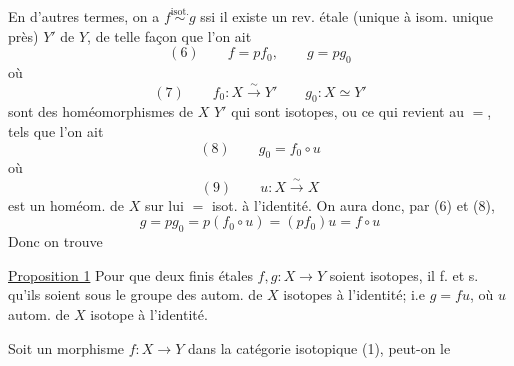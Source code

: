 En d'autres termes, on a $f\overset{\mathrm{isot.}}{\sim}g$ ssi il existe un rev.  étale (unique à isom. unique près) $Y'$ de $Y$, de telle façon que l'on ait
\[
(6)\qquad f=pf_0,\qquad g=pg_0
\]
où
\[
(7)\qquad f_0:X\xrightarrow{\sim}Y'\qquad g_0:X\simeq Y'
\]
sont des homéomorphismes de $X$  $Y'$ qui sont isotopes, ou ce qui revient au $=$, tels que l'on ait
\[
(8)\qquad g_0=f_0\circ u
\]
où
\[
(9)\qquad u:X\xrightarrow{\sim}X
\]
 est un homéom. de $X$ sur lui $=$ isot. à l'identité. On aura donc, par (6) et (8),
\[
g=pg_0=p(f_0\circ u)=(pf_0)u=f\circ u
\]
Donc on trouve

\uline{Proposition 1} Pour que deux   finis étales $f,g:X\longrightarrow Y$ soient isotopes, il f. et s. qu'ils soient  sous le groupe des autom. de $X$ isotopes à l'identité; i.e $g=fu$, où $u$ autom. de $X$ isotope à l'identité.

Soit un  morphisme $f:X\longrightarrow Y$ dans la catégorie isotopique (1), peut-on le
